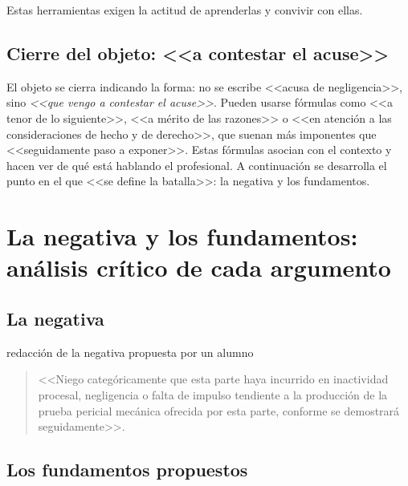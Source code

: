 \documentclass[12pt,oneside]{book}
\begin{document}
Estas herramientas exigen la actitud de aprenderlas y convivir con ellas.

\subsection{Cierre del objeto: <<a contestar el acuse>>}

El objeto se cierra indicando la forma: no se escribe <<acusa de negligencia>>, sino \textit{<<que vengo a contestar el acuse>>}. Pueden usarse fórmulas como <<a tenor de lo siguiente>>, <<a mérito de las razones>> o <<en atención a las consideraciones de hecho y de derecho>>, que suenan más imponentes que <<seguidamente paso a exponer>>. Estas fórmulas asocian con el contexto y hacen ver de qué está hablando el profesional. A continuación se desarrolla el punto en el que <<se define la batalla>>: la negativa y los fundamentos.

\section{La negativa y los fundamentos: análisis crítico de cada argumento}

\subsection{La negativa}

\begin{example}{redacción de la negativa propuesta por un alumno}
\begin{quote}
<<Niego categóricamente que esta parte haya incurrido en inactividad procesal, negligencia o falta de impulso tendiente a la producción de la prueba pericial mecánica ofrecida por esta parte, conforme se demostrará seguidamente>>.
\end{quote}
\end{example}

\subsection{Los fundamentos propuestos}
\end{document}
